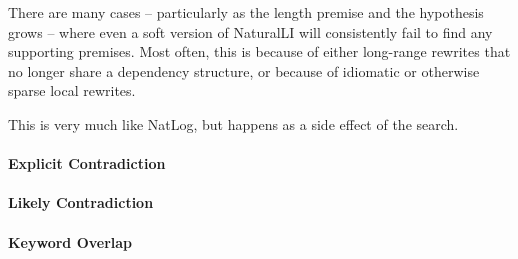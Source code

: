 There are many cases -- particularly as the length premise and the hypothesis grows --
  where even a soft version of NaturalLI will consistently fail to find any supporting
  premises.
Most often, this is because of either long-range rewrites that no longer share a
  dependency structure, or because of idiomatic or otherwise sparse local rewrites.






This is very much like NatLog, but happens as a side effect of the search.


\paragraph{Explicit Contradiction}

\paragraph{Likely Contradiction}

\paragraph{Keyword Overlap}

